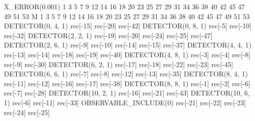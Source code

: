 X_ERROR(0.001) 1 3 5 7 9 12 14 16 18 20 23 25 27 29 31 34 36 38 40 42 45 47 49 51 53
M 1 3 5 7 9 12 14 16 18 20 23 25 27 29 31 34 36 38 40 42 45 47 49 51 53
DETECTOR(0, 4, 1) rec[-15] rec[-20] rec[-42]
DETECTOR(0, 8, 1) rec[-5] rec[-10] rec[-32]
DETECTOR(2, 2, 1) rec[-19] rec[-20] rec[-24] rec[-25] rec[-47]
DETECTOR(2, 6, 1) rec[-9] rec[-10] rec[-14] rec[-15] rec[-37]
DETECTOR(4, 4, 1) rec[-13] rec[-14] rec[-18] rec[-19] rec[-40]
DETECTOR(4, 8, 1) rec[-3] rec[-4] rec[-8] rec[-9] rec[-30]
DETECTOR(6, 2, 1) rec[-17] rec[-18] rec[-22] rec[-23] rec[-45]
DETECTOR(6, 6, 1) rec[-7] rec[-8] rec[-12] rec[-13] rec[-35]
DETECTOR(8, 4, 1) rec[-11] rec[-12] rec[-16] rec[-17] rec[-38]
DETECTOR(8, 8, 1) rec[-1] rec[-2] rec[-6] rec[-7] rec[-28]
DETECTOR(10, 2, 1) rec[-16] rec[-21] rec[-43]
DETECTOR(10, 6, 1) rec[-6] rec[-11] rec[-33]
OBSERVABLE_INCLUDE(0) rec[-21] rec[-22] rec[-23] rec[-24] rec[-25]
